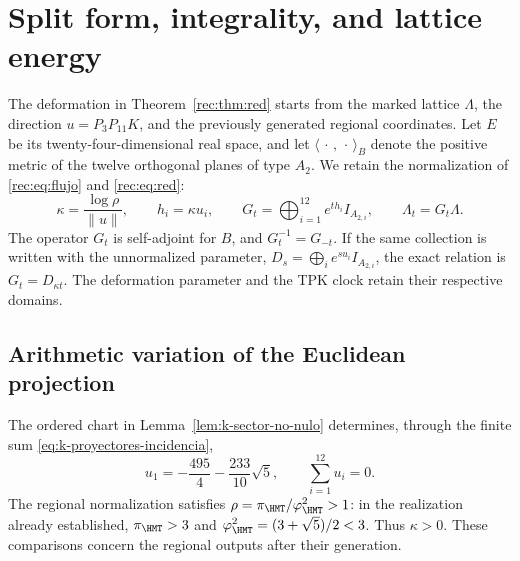 \section{Split form, integrality, and lattice energy}
\label{corpus9:xii:forma-partida}

The deformation in Theorem~\ref{rec:thm:red} starts from the marked
lattice \(\Lambda\), the direction \(u=P_3P_{11}K\), and the
previously generated regional coordinates. Let \(E\) be its
twenty-four-dimensional real space, and let
\(\langle\,\cdot\,,\,\cdot\,\rangle_B\) denote the positive metric
of the twelve orthogonal planes of type \(A_2\). We retain the
normalization of \eqref{rec:eq:flujo} and \eqref{rec:eq:red}:
\begin{equation}
 \kappa=\frac{\log\rho}{\|u\|},\qquad h_i=\kappa u_i,
 \qquad
 G_t=\bigoplus_{i=1}^{12}e^{th_i}I_{A_{2,i}},\qquad
 \Lambda_t=G_t\Lambda.
 \label{corpus9:xii:normalizacion-flujo}
\end{equation}
The operator \(G_t\) is self-adjoint for \(B\), and
\(G_t^{-1}=G_{-t}\). If the same collection is written with the
unnormalized parameter, \(D_s=\bigoplus_i e^{su_i}I_{A_{2,i}}\), the
exact relation is \(G_t=D_{\kappa t}\). The deformation parameter and
the TPK clock retain their respective domains.

\subsection{Arithmetic variation of the Euclidean projection}
\label{corpus9:xii:variacion-euclidea}

The ordered chart in Lemma~\ref{lem:k-sector-no-nulo} determines,
through the finite sum \eqref{eq:k-proyectores-incidencia},
\begin{equation}
 u_1=-\frac{495}{4}-\frac{233}{10}\sqrt5,
 \qquad \sum_{i=1}^{12}u_i=0.
 \label{corpus9:xii:coordenada-testigo}
\end{equation}
The regional normalization satisfies
\(\rho=\pi_{\HMT}/\varphi_{\HMT}^2>1\): in the realization already
established, \(\pi_{\HMT}>3\) and
\(\varphi_{\HMT}^2=(3+\sqrt5)/2<3\). Thus \(\kappa>0\).
These comparisons concern the regional outputs after their generation.


